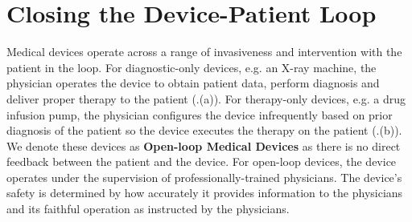 
\section{Closing the Device-Patient Loop}
Medical devices operate across a range of invasiveness and intervention with the patient in the loop. For diagnostic-only devices, e.g. an X-ray machine, the physician operates the device to obtain patient data, perform diagnosis and deliver proper therapy to the patient (.(a)). For therapy-only devices, e.g. a drug infusion pump, the physician configures the device infrequently based on prior diagnosis of the patient so the device executes the therapy on the patient (.(b)). We denote these devices as \textbf{Open-loop Medical Devices} as there is no direct feedback between the patient and the device. For open-loop devices, the device operates under the supervision of professionally-trained physicians. The device's safety is determined by how accurately it provides information to the physicians and its faithful operation as instructed by the physicians.

